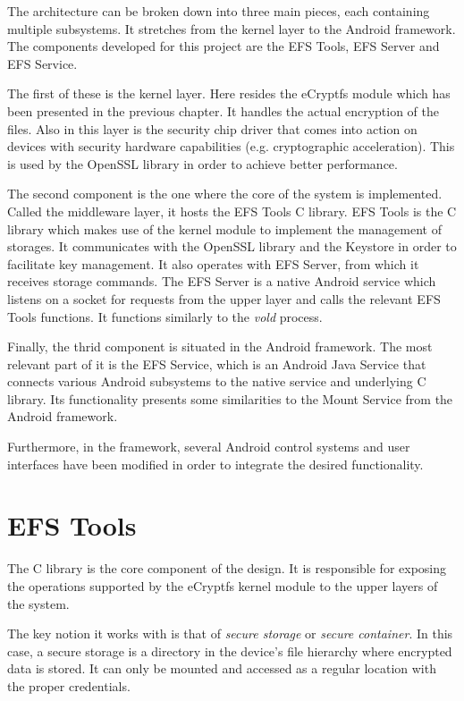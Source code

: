 The architecture can be broken down into three main pieces, each containing multiple subsystems. It stretches from the kernel layer to the Android framework. The components developed for this project are the EFS Tools, EFS Server and EFS Service.

The first of these is the kernel layer. Here resides the eCryptfs module which has been presented in the previous chapter. It handles the actual encryption of the files. Also in this layer is the security chip driver that comes into action on devices with security hardware capabilities (e.g. cryptographic acceleration). This is used by the OpenSSL library in order to achieve better performance.

The second component is the one where the core of the system is implemented. Called the middleware layer, it hosts the EFS Tools C library. EFS Tools is the C library which makes use of the kernel module to implement the management of storages. It communicates with the OpenSSL library and the Keystore in order to facilitate key management. It also operates with EFS Server, from which it receives storage commands. The EFS Server is a native Android service which listens on a socket for requests from the upper layer and calls the relevant EFS Tools functions. It functions similarly to the \textit{vold} process.

Finally, the thrid component is situated in the Android framework. The most relevant part of it is the EFS Service, which is an Android Java Service that connects various Android subsystems to the native service and underlying C library. Its functionality presents some similarities to the Mount Service from the Android framework.

Furthermore, in the framework, several Android control systems and user interfaces have been modified in order to integrate the desired functionality.

\section{EFS Tools}
\label{sec:c-multi-user}

The C library is the core component of the design. It is responsible for exposing the operations supported by the eCryptfs kernel module to the upper layers of the system.

The key notion it works with is that of \textit{secure storage} or \textit{secure container}. In this case, a secure storage is a directory in the device's file hierarchy where encrypted data is stored. It can only be mounted and accessed as a regular location with the proper credentials.

